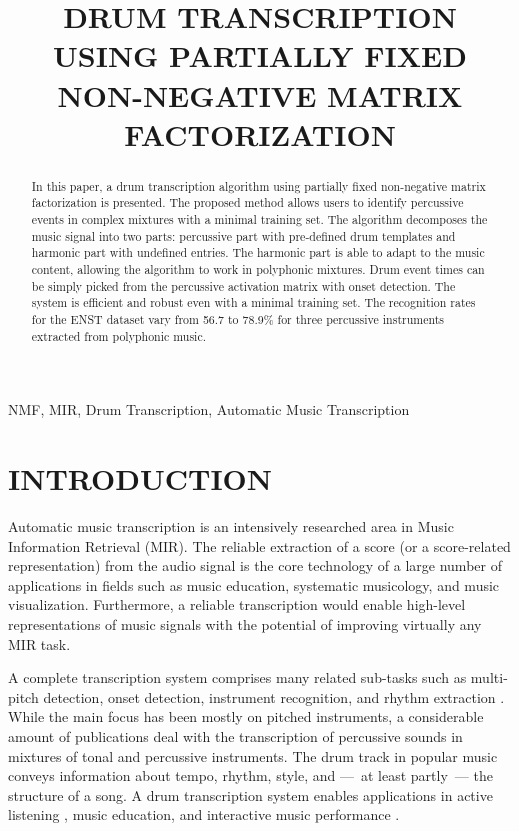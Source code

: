 \documentclass[a4paper]{article}
\title{DRUM TRANSCRIPTION USING PARTIALLY FIXED NON-NEGATIVE MATRIX FACTORIZATION}
\begin{document}
%
\maketitle
%
\begin{abstract}
In this paper, a drum transcription algorithm using partially fixed non-negative matrix factorization is presented. The proposed method allows users to identify percussive events in complex mixtures with a minimal training set. The algorithm decomposes the music signal into two parts: percussive part with pre-defined drum templates and harmonic part with undefined entries. The harmonic part is able to adapt to the music content, allowing the algorithm to work in polyphonic mixtures. Drum event times can be simply picked from the percussive activation matrix with onset detection. The system is efficient and robust even with a minimal training set. The recognition rates for the ENST dataset vary from 56.7 to 78.9\% for three percussive instruments extracted from polyphonic music. 
\end{abstract}
%
\begin{keywords}
NMF, MIR, Drum Transcription, Automatic Music Transcription
\end{keywords}
%
\section{INTRODUCTION}\label{sec:introduction}
Automatic music transcription is an intensively researched area in Music Information Retrieval (MIR). The reliable extraction of a score (or a score-related representation) from the audio signal is the core technology of a large number of applications in fields such as music education, systematic musicology, and music visualization. Furthermore, a reliable transcription would enable high-level representations of music signals with the potential of improving virtually any MIR task.

A complete transcription system comprises many related sub-tasks such as multi-pitch detection, onset detection, instrument recognition, and rhythm extraction \cite{benetos_automatic_2013}. While the main focus has been mostly on pitched instruments, a considerable amount of publications deal with the transcription of percussive sounds in mixtures of tonal and percussive instruments. The drum track in popular music conveys information about tempo, rhythm, style, and ---~at least partly~--- the structure of a song. A drum transcription system enables applications in active listening \cite{yoshii_Drumix:_2007}, music education, and interactive music performance \cite{weinberg_interactive_2009}.
\end{document}
